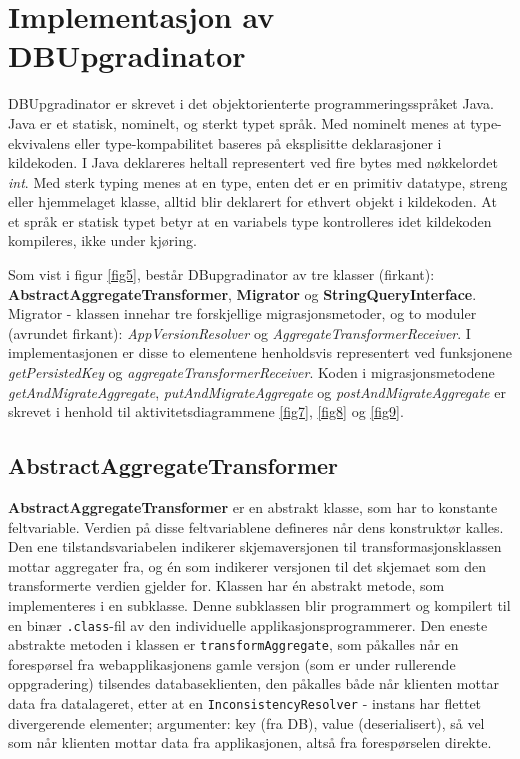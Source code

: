 \section{Implementasjon av DBUpgradinator}

DBUpgradinator er skrevet i det objektorienterte programmeringsspråket Java. Java er et statisk, nominelt, og sterkt typet språk. Med nominelt menes at type-ekvivalens eller type-kompabilitet baseres på eksplisitte deklarasjoner i kildekoden. I Java deklareres heltall representert ved fire bytes med nøkkelordet \emph{int}. Med sterk typing menes at en type, enten det er en primitiv datatype, streng eller hjemmelaget klasse, alltid blir deklarert for ethvert objekt i kildekoden. At et språk er statisk typet betyr at en variabels type kontrolleres idet kildekoden kompileres, ikke under kjøring.

Som vist i figur \ref{fig5}, består DBupgradinator av tre klasser (firkant): \textbf{AbstractAggregateTransformer}, \textbf{Migrator} og \textbf{StringQueryInterface}. Migrator - klassen innehar tre forskjellige migrasjonsmetoder, og to moduler (avrundet firkant): \emph{AppVersionResolver} og \emph{AggregateTransformerReceiver}. I implementasjonen er disse to elementene henholdsvis representert ved funksjonene \emph{getPersistedKey} og \emph{aggregateTransformerReceiver}. Koden i migrasjonsmetodene \emph{getAndMigrateAggregate}, \emph{putAndMigrateAggregate} og \emph{postAndMigrateAggregate} er skrevet i henhold til aktivitetsdiagrammene \ref{fig7}, \ref{fig8} og \ref{fig9}.

\subsection{AbstractAggregateTransformer}



\textbf{AbstractAggregateTransformer} er en abstrakt klasse, som har to konstante feltvariable. Verdien på disse feltvariablene defineres når dens konstruktør kalles. Den ene tilstandsvariabelen indikerer skjemaversjonen til transformasjonsklassen mottar aggregater fra, og én som indikerer versjonen til det skjemaet som den transformerte verdien gjelder for. Klassen har én abstrakt metode, som implementeres i en subklasse. Denne subklassen blir programmert og kompilert til en binær \texttt{.class}-fil av den individuelle applikasjonsprogrammerer. Den eneste abstrakte metoden i klassen er \texttt{transformAggregate}, som påkalles når en forespørsel fra webapplikasjonens gamle versjon (som er under rullerende oppgradering) tilsendes databaseklienten, den påkalles både når klienten mottar data fra datalageret, etter at en \texttt{InconsistencyResolver} - instans har flettet divergerende elementer; argumenter: key (fra DB), value (deserialisert), så vel som når klienten mottar data fra applikasjonen, altså fra forespørselen direkte.

